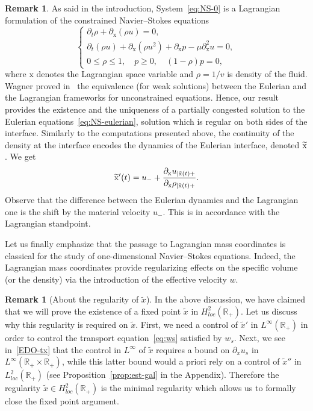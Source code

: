 \documentclass[10pt]{amsart}
\theoremstyle{definition}\newtheorem{defi}[theo]{Definition}\newtheorem{rema}[theo]{Remark}\newtheorem{exam}[theo]{Example}\newtheorem{exem}[theo]{Example}\newtheorem{nota}[theo]{Notation}
\newcommand{\R}{\mathbb{R}}
\newcommand{\x}{\mathrm{x}}
\newcommand{\tx}{\widetilde{x}}
\let\oldtilde\tilde
\renewcommand*{\tilde}[1]{\mathchoice{\widetilde{#1}}{\widetilde{#1}}{\oldtilde{#1}}{\oldtilde{#1}}}
\begin{document}
\begin{rema}
As said in the introduction, System~\eqref{eq:NS-0} is a Lagrangian formulation of the constrained Navier--Stokes equations
\begin{equation}\label{eq:NS-eulerian}
\begin{cases}
\partial_t \rho + \partial_\x (\rho u) = 0, \\
\partial_t(\rho u) + \partial_\x (\rho u^2) + \partial_\x p - \mu \partial^2_\x u = 0, \\
0 \leq \rho \leq 1, \quad p \geq 0, \quad (1-\rho)p= 0,
\end{cases}
\end{equation}
where $\x$ denotes the Lagrangian space variable and $\rho = 1/v$ is density of the fluid. Wagner proved in~\cite{wagner1987} the equivalence (for weak solutions) between the Eulerian and the Lagrangian frameworks for unconstrained equations. Hence, our result provides the existence and the uniqueness of a partially congested solution to the Eulerian equations~\eqref{eq:NS-eulerian}, solution which is regular on both sides of the interface. Similarly to the computations presented above, the continuity of the density at the interface encodes the dynamics of the Eulerian interface, denoted $\tilde \x$. We get
\[
\tilde \x' (t) = u_- + \dfrac{\partial_\x u_{|\tilde \x(t) +}}{\partial_\x \rho_{|\tilde \x(t) +}}.
\]
Observe that the difference between the Eulerian dynamics and the Lagrangian one is the shift by the material velocity $u_-$. This is in accordance with the Lagrangian standpoint.


Let us finally emphasize that the passage to Lagrangian mass coordinates is classical for the study of one-dimensional Navier--Stokes equations. Indeed, the Lagrangian mass coordinates provide regularizing effects on the specific volume (or the density) via the introduction of the effective velocity $w$.
\end{rema}





\begin{rema}[About the regularity of $\tx$]
In the above discussion, we have claimed that we will prove the existence of a fixed point $\tx$ in $H^2_{loc}(\R_+)$. Let us discuss why this regularity is required on $\tx$. First, we need a control of $\tx'$ in $L^\infty(\R_+)$ in order to control the transport equation~\eqref{eq:ws} satisfied by $w_s$. Next, we see in~\eqref{EDO-tx} that the control in $L^\infty$ of $\tx$ requires a bound on $\partial_x u_s$ in $L^\infty(\R_+ \times \R_+)$, while this latter bound would a priori rely on a control of $\tx''$ in $L^2_{loc}(\R_+)$ (see Proposition~\ref{prop:est-gal} in the Appendix). Therefore the regularity $\tx \in H^2_{loc}(\R_+)$ is the minimal regularity which allows us to formally close the fixed point argument.
\end{rema}
\end{document}
